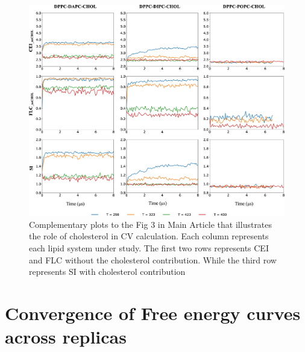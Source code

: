 \documentclass[10pt]{article}
\let\oldsection\section
\renewcommand{\section}{\clearpage\oldsection}
\begin{document}
\begin{figure}[H]
    \centering
    \includegraphics[width=6.5in]{Figures/Supplementary/RoleOfCHOL/placeholder.jpg}
    \caption{Complementary plots to the Fig 3 in Main Article that illustrates the role of cholesterol in CV calculation. Each column represents each lipid system under study. The first two rows represents CEI and FLC without the cholesterol contribution. While the third row represents SI with cholesterol contribution}
    \label{figss6:view}
\end{figure}

\section*{Convergence of Free energy curves across replicas}
\end{document}
